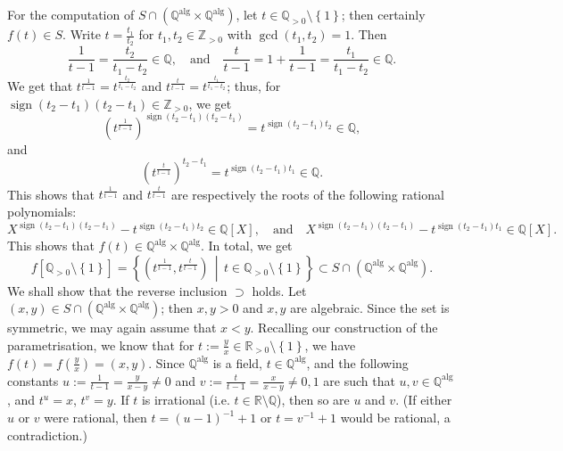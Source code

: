 \begin{solution}
    \\\\
    For the computation of \( S \cap \left( \mathbb{Q}^{\mathrm{alg}} \times \mathbb{Q}^{\mathrm{alg}} \right) \), let \( t \in \mathbb{Q}_{>0} \setminus \left\{1\right\} \); then certainly \( f\left(t\right) \in S \). Write \( t = \frac{t_1}{t_2} \) for \( t_1, t_2 \in \mathbb{Z}_{>0} \) with \( \gcd\left(t_1, t_2\right) = 1 \). Then
    \[
        \frac{1}{t - 1} = \frac{t_2}{t_1 - t_2} \in \mathbb{Q}, \quad \text{and} \quad \frac{t}{t - 1} = 1 + \frac{1}{t - 1} = \frac{t_1}{t_1 - t_2} \in \mathbb{Q}.
    \]
    We get that \( t^{\frac{1}{t - 1}} = t^{\frac{t_2}{t_1 - t_2}} \) and \( t^{\frac{t}{t - 1}} = t^{\frac{t_1}{t_1 - t_2}} \); thus, for \( \operatorname{sign}\left(t_2 - t_1\right)\left(t_2 - t_1\right) \in \mathbb{Z}_{>0} \), we get
    \[
        \left( t^{\frac{1}{t - 1}} \right)^{\operatorname{sign}\left(t_2 - t_1\right)\left(t_2 - t_1\right)} = t^{\operatorname{sign}\left(t_2 - t_1\right)t_2} \in \mathbb{Q},
    \]
    and
    \[
        \left( t^{\frac{t}{t - 1}} \right)^{t_2 - t_1} = t^{\operatorname{sign}\left(t_2 - t_1\right)t_1} \in \mathbb{Q}.
    \]
    This shows that \( t^{\frac{1}{t - 1}} \) and \( t^{\frac{t}{t - 1}} \) are respectively the roots of the following rational polynomials:
    \[
        X^{\operatorname{sign}\left(t_2 - t_1\right)\left(t_2 - t_1\right)} - t^{\operatorname{sign}\left(t_2 - t_1\right)t_2} \in \mathbb{Q}\left[X\right], \quad \text{and} \quad X^{\operatorname{sign}\left(t_2 - t_1\right)\left(t_2 - t_1\right)} - t^{\operatorname{sign}\left(t_2 - t_1\right)t_1} \in \mathbb{Q}\left[X\right].
    \]
    This shows that \( f\left(t\right) \in \mathbb{Q}^{\mathrm{alg}} \times \mathbb{Q}^{\mathrm{alg}} \). In total, we get
    \[
        f\left[ \mathbb{Q}_{>0} \setminus \left\{1\right\} \right] = \left\{ \left( t^{\frac{1}{t - 1}}, t^{\frac{t}{t - 1}} \right) \,\middle|\, t \in \mathbb{Q}_{>0} \setminus \left\{1\right\} \right\} \subset S \cap \left( \mathbb{Q}^{\mathrm{alg}} \times \mathbb{Q}^{\mathrm{alg}} \right).
    \]
    We shall show that the reverse inclusion \( \supset \) holds. Let \( \left(x, y\right) \in S \cap \left( \mathbb{Q}^{\mathrm{alg}} \times \mathbb{Q}^{\mathrm{alg}} \right) \); then \( x, y > 0 \) and \( x, y \) are algebraic. Since the set is symmetric, we may again assume that \( x < y \). Recalling our construction of the parametrisation, we know that for \( t := \frac{y}{x} \in \mathbb{R}_{>0} \setminus \left\{1\right\} \), we have \( f\left(t\right) = f\left( \frac{y}{x} \right) = \left(x, y\right) \). Since \( \mathbb{Q}^{\mathrm{alg}} \) is a field, \( t \in \mathbb{Q}^{\mathrm{alg}} \), and the following constants \( u := \frac{1}{t - 1} = \frac{y}{x - y} \neq 0 \) and \( v := \frac{t}{t - 1} = \frac{x}{x - y} \neq 0,1 \) are such that \( u, v \in \mathbb{Q}^{\mathrm{alg}} \), and \( t^{u} = x \), \( t^{v} = y \). If \( t \) is irrational (i.e. \( t \in \mathbb{R} \setminus \mathbb{Q} \)), then so are \( u \) and \( v \). (If either \( u \) or \( v \) were rational, then \( t = \left(u - 1\right)^{-1} + 1 \) or \( t = v^{-1} + 1 \) would be rational, a contradiction.)

\end{solution}
